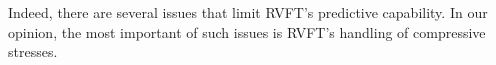 \documentclass[11pt,letterpaper]{report}
\begin{document}
\begin{enumerate}[label=\textit{2.\arabic*},wide, labelwidth=!, labelindent=0pt]
Indeed, there are several issues that limit RVFT's predictive capability. %
 In our opinion, the most important of such issues is RVFT's handling of compressive stresses. %
 
 
 
 

\end{enumerate}
\end{document}
